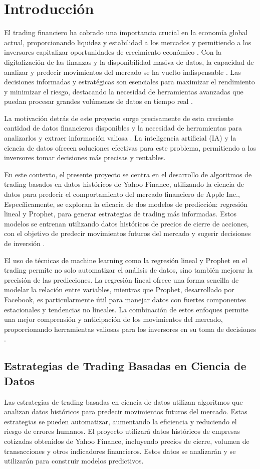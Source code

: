 \section{Introducción}
El trading financiero ha cobrado una importancia crucial en la economía global actual, proporcionando liquidez y estabilidad a los mercados y permitiendo a los inversores capitalizar oportunidades de crecimiento económico \cite{b1}. Con la digitalización de las finanzas y la disponibilidad masiva de datos, la capacidad de analizar y predecir movimientos del mercado se ha vuelto indispensable \cite{b2}. Las decisiones informadas y estratégicas son esenciales para maximizar el rendimiento y minimizar el riesgo, destacando la necesidad de herramientas avanzadas que puedan procesar grandes volúmenes de datos en tiempo real \cite{b3}.

La motivación detrás de este proyecto surge precisamente de esta creciente cantidad de datos financieros disponibles y la necesidad de herramientas para analizarlos y extraer información valiosa \cite{b4}. La inteligencia artificial (IA) y la ciencia de datos ofrecen soluciones efectivas para este problema, permitiendo a los inversores tomar decisiones más precisas y rentables.

En este contexto, el presente proyecto se centra en el desarrollo de algoritmos de trading basados en datos históricos de Yahoo Finance, utilizando la ciencia de datos para predecir el comportamiento del mercado financiero de Apple Inc., Específicamente, se exploran la eficacia de dos modelos de predicción: regresión lineal y Prophet, para generar estrategias de trading más informadas. Estos modelos se entrenan utilizando datos históricos de precios de cierre de acciones, con el objetivo de predecir movimientos futuros del mercado y sugerir decisiones de inversión \cite{b7}.

El uso de técnicas de machine learning como la regresión lineal y Prophet en el trading permite no solo automatizar el análisis de datos, sino también mejorar la precisión de las predicciones. La regresión lineal ofrece una forma sencilla de modelar la relación entre variables, mientras que Prophet, desarrollado por Facebook, es particularmente útil para manejar datos con fuertes componentes estacionales y tendencias no lineales. La combinación de estos enfoques permite una mejor comprensión y anticipación de los movimientos del mercado, proporcionando herramientas valiosas para los inversores en su toma de decisiones \cite{b10}.
\subsection{Estrategias de Trading Basadas en Ciencia de Datos}
Las estrategias de trading basadas en ciencia de datos utilizan algoritmos que analizan datos históricos para predecir movimientos futuros del mercado. Estas estrategias se pueden automatizar, aumentando la eficiencia y reduciendo el riesgo de errores humanos.
El proyecto utilizará datos históricos de empresas cotizadas obtenidos de Yahoo Finance, incluyendo precios de cierre, volumen de transacciones y otros indicadores financieros. Estos datos se analizarán y se utilizarán para construir modelos predictivos.

